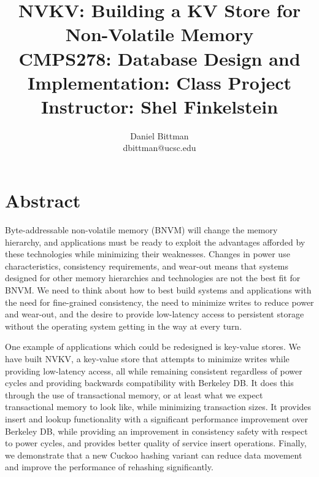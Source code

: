 \documentclass[twocolumn,11pt]{article}
\author{Daniel Bittman \\ dbittman@ucsc.edu}
\title{NVKV: Building a KV Store for Non-Volatile Memory\\{\Large CMPS278:
Database Design and Implementation: Class Project\\\vspace{-2mm}Instructor: Shel Finkelstein}}
\newcommand{\bdb}{Berkeley DB\xspace}
\begin{document}
\biolinum
\maketitle
\libertine 
\renewcommand\ttdefault{lmtt}






\section*{Abstract}


Byte-addressable non-volatile memory (BNVM) will change the memory hierarchy, and
applications must be ready to exploit the advantages afforded by these
technologies while minimizing their weaknesses. Changes in power use
characteristics, consistency requirements, and wear-out means that systems
designed for other memory hierarchies and technologies are not the best fit for
BNVM. We need to think about how to best build systems and applications with the
need for fine-grained consistency, the need to minimize writes to reduce power
and wear-out, and the desire to provide low-latency access to persistent storage
without the operating system getting in the way at every turn.


One example of applications which could be redesigned is key-value stores. We
have built NVKV, a key-value store that attempts to minimize writes while
providing low-latency access, all while remaining consistent regardless of power
cycles and providing backwards compatibility with \bdb. It does this through the
use of transactional memory, or at least what we expect transactional memory to
look like, while minimizing transaction sizes. It provides insert and lookup
functionality with a significant performance improvement over \bdb, while
providing an improvement in consistency safety with respect to power cycles, and
provides better quality of service insert operations. Finally, we demonstrate
that a new Cuckoo hashing variant can reduce data movement and improve the
performance of rehashing significantly.
\end{document}
